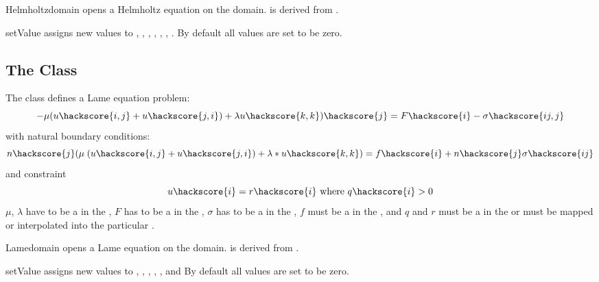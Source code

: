 \begin{classdesc}{Helmholtz}{domain}
opens a Helmholtz equation on the \Domain domain. \Helmholtz is derived from \LinearPDE.
\end{classdesc}
\begin{methoddesc}[Helmholtz]{setValue}{       }
assigns new values to , , , , , , . By default all values are set to be zero.
\end{methoddesc}

\subsection{The \Lame Class}
The \Lame class defines a Lame equation problem:
\begin{equation}\label{LE.1}
-\mu (u\hackscore{i,j}+u\hackscore{j,i})+\lambda u\hackscore{k,k})\hackscore{j} = F\hackscore{i}-\sigma\hackscore{ij,j}
\end{equation}
with natural boundary conditions:
\begin{equation}\label{LE.2}
n\hackscore{j}(\mu \; (u\hackscore{i,j}+u\hackscore{j,i})+\lambda*u\hackscore{k,k}) = f\hackscore{i}+n\hackscore{j}\sigma\hackscore{ij}
\end{equation}
and constraint
\begin{equation}\label{LE.3}
u\hackscore{i}=r\hackscore{i} \mbox{ where } q\hackscore{i}>0
\end{equation}
$\mu$, $\lambda$ have to be a \Scalar in the \Function,
$F$ has to be a \Vector in the \Function,
$\sigma$ has to be a \Tensor in the \Function,
$f$ must be a \Vector in  the \FunctionOnBoundary,
and $q$ and $r$ must be a \Vector in  the \SolutionFS or must be mapped or interpolated into the particular \FunctionSpace.

\begin{classdesc}{Lame}{domain}
opens a Lame equation on the \Domain domain. \Lame is derived from \LinearPDE.
\end{classdesc}
\begin{methoddesc}[Lame]{setValue}{       }
assigns new values to 
,
,
,
,
,
 and
By default all values are set to be zero.
\end{methoddesc}

